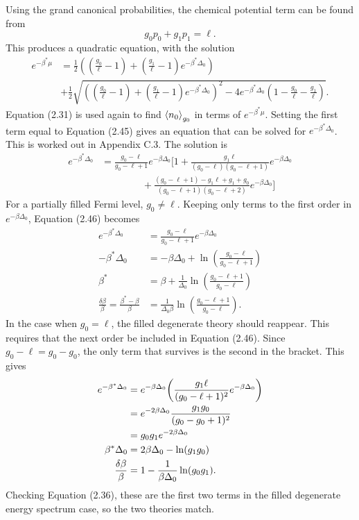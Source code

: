 Using the grand canonical probabilities, the chemical potential term can be found from
\begin{equation}
    g_0 p_0+g_1 p_1=\ell.
\end{equation}
This produces a quadratic equation, with the solution
\begin{align}
    e^{-\beta^*\mu }&=\frac{1}{2}((\frac{g_0}{\ell}-1)+(\frac{g_1}{\ell}-1)e^{-\beta^*\Delta_0})\nonumber\\
    &+\frac{1}{2}\sqrt{((\frac{g_0}{\ell}-1)+(\frac{g_1}{\ell}-1)e^{-\beta^*\Delta_0})^2-4e^{-\beta^*\Delta_0}(1-\frac{g_0}{\ell}-\frac{g_1}{\ell})}.
\end{align}
Equation (2.31) is used again to find $\left<{n_0}\right>_{g_0}$ in terms of $e^{-\beta^*\mu}$.
Setting the first term equal to Equation (2.45) gives an equation that can be solved for $e^{-\beta^*\Delta_0}$. This is worked out in Appendix C.3. The solution is
\begin{align}
    e^{-\beta^*\Delta_0}&=\frac{g_0-\ell}{g_0-\ell+1}e^{-\beta\Delta_0} \Biggr[1+\frac{g_1 \ell}{(g_0-\ell)(g_0-\ell+1)}e^{-\beta\Delta_0}\nonumber\\
    &\ \ \ \ \ \ \ \ \ \ \ \ \ \ \ \ \ \ \ +\frac{(g_0-\ell+1)-g_1\ell+g_1+g_0}{(g_0-\ell+1)(g_0-\ell+2)}e^{-\beta\Delta_0}\Biggr]
\end{align}
For a partially filled Fermi level, $g_0\neq \ell$. Keeping only terms to the first order in $e^{-\beta\Delta_0}$, Equation (2.46) becomes
\begin{align}
    e^{-\beta^*\Delta_0}&=\frac{g_0-\ell}{g_0-\ell+1} e^{-\beta\Delta_0}\nonumber\\
    -\beta^*\Delta_0&=-\beta\Delta_0+\ln(\frac{g_0-\ell}{g_0-\ell+1})\nonumber\\
    \beta^*&=\beta+\frac{1}{\Delta_0}\ln(\frac{g_0-\ell+1}{g_0-\ell})\nonumber\\
    \frac{\delta\beta}{\beta}=\frac{\beta^*-\beta}{\beta}&=\frac{1}{\Delta_0 \beta}\ln(\frac{g_0-\ell+1}{g_0-\ell}).
\end{align}
In the case when $g_0=\ell$, the filled degenerate theory should reappear. This requires that the next order be included in Equation (2.46). Since $g_0-\ell=g_0-g_0$, the only term that survives is the second in the bracket. This gives
\begin{align}
    e^{-\beta^*\Delta_0}&= e^{-\beta\Delta_0} \qty(\frac{g_1 \ell}{(g_0-\ell+1)^2} e^{-\beta\Delta_0})\nonumber\\
    &=e^{-2\beta\Delta_0} \frac{g_1 g_0}{(g_0-g_0+1)^2}\nonumber\\
    &=g_0g_1e^{-2\beta\Delta_0}\nonumber\\
    \beta^*\Delta_0&=2\beta\Delta_0 - \ln(g_1g_0)\nonumber\\
    \frac{\delta\beta}{\beta}&=1-\frac{1}{\beta\Delta_0} \ln(g_0g_1).
\end{align}
Checking Equation (2.36), these are the first two terms in the filled degenerate energy spectrum case, so the two theories match. 
